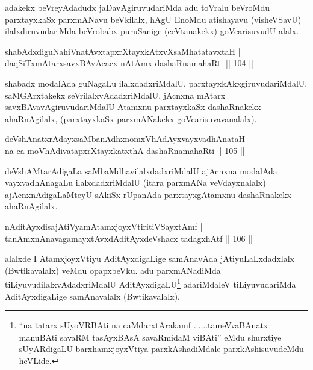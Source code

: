 \begin{artha}
adakekx beVreyAdadudx jaDavAgiruvudariMda adu toVralu beVroMdu parxtayxkaSx parxmANavu beVkilalx, hAgU EnoMdu atishayavu (visheVSavU) ilalxdiruvudariMda beVrobabx puruSanige (ceVtanakekx) goVcarisuvudU alalx.
\end{artha}

\begin{shl}
shabAdxdiguNahiVnatAvxtapxrXtayxkAtxvXsaMhatatavxtaH | \\
daqSiTxmAtarxsavxBAvAcacx nA\s \s tAmx dashaRnamahaRti \hfill||  104 ||  
\end{shl}

\begin{artha}
shabadx modalAda guNagaLu ilalxdadxriMdalU, parxtayxkAkxgiruvudariMdalU, saMGArxtakekx seVrilalxvAdadxriMdalU, jAcnxna mAtarx savxBAvavAgiruvudariMdalU Atamxnu parxtayxkaSx dashaRnakekx ahaRnAgilalx, (parxtayxkaSx parxmANakekx goVcarisuvavanalalx).
\end{artha}


\begin{shl}
deVshAnatxrAdayxsaMbanAdhxnomxVhAdAyxvayxvadhAnataH |  \\
na ca moVhAdivatapxrXtayxkatxthA dashaRnamahaRti \hfill||  105 ||  
\end{shl}

\begin{artha}
deVshAMtarAdigaLa saMbaMdhavilalxdadxriMdalU ajAcnxna modalAda vayxvadhAnagaLu ilalxdadxriMdalU (itara parxmANa veVdayxnalalx) ajAcnxnAdigaLaMteyU sAkiSx rUpanAda parxtayxgAtamxnu dashaRnakekx ahaRnAgilalx.
\end{artha}

\begin{shl}
nA\s \s ditAyxdisajAtiVyamAtamxjoyxVtiritiVSayxtAmf | \\
tanAmxnAnavagamayxtAvxdAditAyxdeVshacx tadagxhAtf \hfill||  106 ||  
\end{shl}

\begin{artha}
alalxde I AtamxjoyxVtiyu AditAyxdigaLige samAnavAda jAtiyuLaLxdadxlalx (Bwtikavalalx) veMdu opapxbeVku. adu parxmANadiMda tiLiyuvudilalxvAdadxriMdalU AditAyxdigaLU\footnote{``na tatarx sUyoVRBAti na caMdarxtArakamf ......tameVvaBAnatx manuBAti savaRM tasAyxBAsA savaRmidaM viBAti'' eMdu shurxtiye sUyARdigaLU barxhamxjoyxVtiya parxkAshadiMdale parxkAshisuvudeMdu heVLide.} adariMdaleV tiLiyuvudariMda AditAyxdigaLige samAnavalalx (Bwtikavalalx).
\end{artha}

